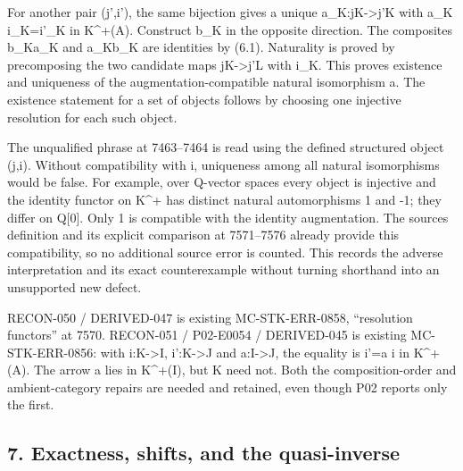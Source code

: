 For another pair (j',\allowbreak{}i')\allowbreak{},\allowbreak{} the same bijection gives a unique a\_\allowbreak{}K:\allowbreak{}jK\allowbreak{}->j'K with a\_\allowbreak{}K i\_\allowbreak{}K\allowbreak{}=i'\_\allowbreak{}K in K\textasciicircum{}\allowbreak{}+(A)\allowbreak{}. Construct b\_\allowbreak{}K in the opposite direction. The composites b\_\allowbreak{}Ka\_\allowbreak{}K and a\_\allowbreak{}Kb\_\allowbreak{}K are identities by (6.1)\allowbreak{}. Naturality is proved by precomposing the two candidate maps jK\allowbreak{}->j'L with i\_\allowbreak{}K. This proves existence and uniqueness of the augmentation-compatible natural isomorphism a. The existence statement for a set of objects follows by choosing one injective resolution for each such object.

The unqualified phrase at 7463–\allowbreak{}7464 is read using the defined structured object (j,\allowbreak{}i)\allowbreak{}. Without compatibility with i,\allowbreak{} uniqueness among all natural isomorphisms would be false. For example,\allowbreak{} over Q-vector spaces every object is injective and the identity functor on K\textasciicircum{}\allowbreak{}+ has distinct natural automorphisms 1 and -1; they differ on Q[0]\allowbreak{}. Only 1 is compatible with the identity augmentation. The source\textquotesingle s definition and its explicit comparison at 7571–\allowbreak{}7576 already provide this compatibility,\allowbreak{} so no additional source error is counted. This records the adverse interpretation and its exact counterexample without turning shorthand into an unsupported new defect.

RECON-050 /\allowbreak{} DERIVED-047 is existing MC-STK-ERR-0858,\allowbreak{} ``resolution functors'' at 7570. RECON-051 /\allowbreak{} P02-E0054 /\allowbreak{} DERIVED-045 is existing MC-STK-ERR-0856:\allowbreak{} with i:\allowbreak{}K\allowbreak{}->I,\allowbreak{} i':\allowbreak{}K\allowbreak{}->J and a:\allowbreak{}I\allowbreak{}->J,\allowbreak{} the equality is i'\allowbreak{}=a i in K\textasciicircum{}\allowbreak{}+(A)\allowbreak{}. The arrow a lies in K\textasciicircum{}\allowbreak{}+(I)\allowbreak{},\allowbreak{} but K need not. Both the composition-order and ambient-category repairs are needed and retained,\allowbreak{} even though P02 reports only the first.

\subsection{\texorpdfstring{7. Exactness,\allowbreak{} shifts,\allowbreak{} and the quasi-inverse}{7.   and the quasi-inverse}}\label{proofs-7096-7578-exactness-shifts-and-the-quasi-inverse}

